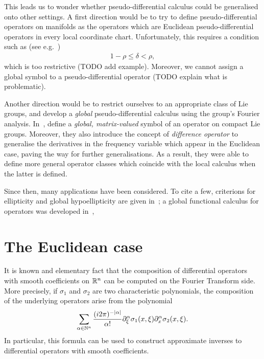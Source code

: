 This leads us to wonder whether pseudo-differential calculus could be generalised onto other settings.
A first direction would be to try to define pseudo-differential operators on manifolds as the operators which are Euclidean pseudo-differential operators in every local coordinate chart.
Unfortunately,
this requires a condition such as
(see e.g.\ \cite[Section 4]{Shubin01})
\begin{align*}
    1 - \rho \leq \delta < \rho,
\end{align*}
which is too restrictive (TODO add example).
Moreover, we cannot assign a global symbol to a pseudo-differential operator (TODO explain what is problematic).

Another direction would be to restrict ourselves to an appropriate class of Lie groups,
and develop a \emph{global} pseudo-differential calculus using the group's Fourier analysis.
In~\cite{RuzhanskyTurunen10},
\citeauthor{RuzhanskyTurunen10} define a \emph{global, matrix-valued} symbol of an operator on compact Lie groups.
Moreover, they also introduce the concept of \emph{difference operator}
to generalise the derivatives in the frequency variable which appear in the Euclidean case,
paving the way for further generalisations.
As a result,
they were able to define more general operator classes which coincide with the local calculus when the latter is defined.

Since then,
many applications have been considered.
To cite a few,
criterions for ellipticity and global hypoellipticity are given in~\cite{RuzhanskyTurunenWirth10};
a global functional calculus for operators was developed in~\cite{RuzhanskyWirth14},

\section{The Euclidean case}

It is known and elementary fact that
the composition of differential operators with smooth coefficients on $\mathbb{R}^n$ can be computed on the Fourier Transform side.
More precisely,
if $\sigma_1$ and $\sigma_2$ are two characteristic polynomials,
the composition of the underlying operators arise from the polynomial
\begin{align}
    \sum_{\alpha \in \N^n} \frac {(\i \turn)^{-\abs \alpha}} {\alpha!} \iD{\xi^\alpha} \sigma_1(x, \xi) \iD{x^\alpha} \sigma_2(x, \xi)
    \label{eq:composition_formula_for_characteristic_polynomials}.
\end{align}
In particular,
this formula can be used to construct approximate inverses to differential operators with smooth coefficients.


